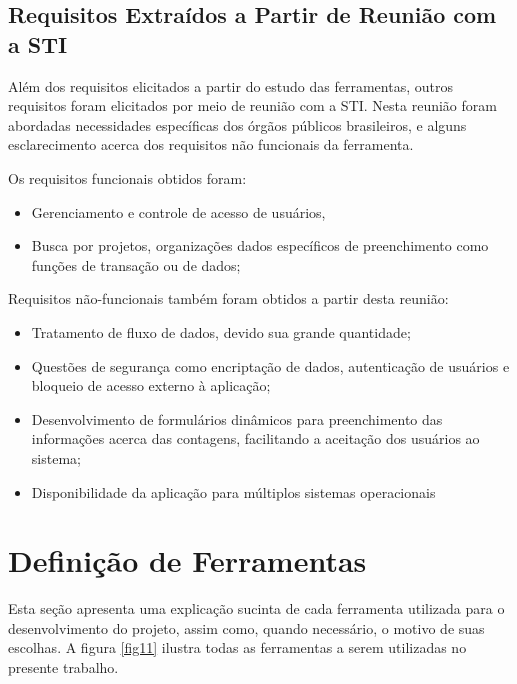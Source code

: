 \subsection{Requisitos Extraídos a Partir de Reunião com a STI}

Além dos requisitos elicitados a partir do estudo das ferramentas, outros requisitos foram elicitados por meio de reunião com a STI. Nesta reunião foram abordadas necessidades específicas dos órgãos públicos brasileiros, e alguns esclarecimento acerca dos requisitos não funcionais da ferramenta.

Os requisitos funcionais obtidos foram:

\begin{itemize}

  \item Gerenciamento e controle de acesso de usuários,

  \item Busca por projetos, organizações  dados específicos de preenchimento
  como funções de transação ou de dados;

\end{itemize}

Requisitos não-funcionais também foram obtidos a partir desta reunião:

\begin{itemize}

  \item Tratamento de fluxo de dados, devido sua grande quantidade;

  \item Questões de segurança como encriptação de dados, autenticação de usuários e bloqueio de acesso externo à aplicação;

  \item Desenvolvimento de formulários dinâmicos para preenchimento das informações acerca das contagens, facilitando a aceitação dos usuários ao sistema;

  \item Disponibilidade da aplicação para múltiplos sistemas operacionais

\end{itemize}

\section{Definição de Ferramentas}

Esta seção apresenta uma explicação sucinta de cada ferramenta utilizada para o desenvolvimento do projeto, assim como, quando necessário, o motivo de suas escolhas. A figura \ref{fig11} ilustra todas as ferramentas a serem utilizadas no presente trabalho.

